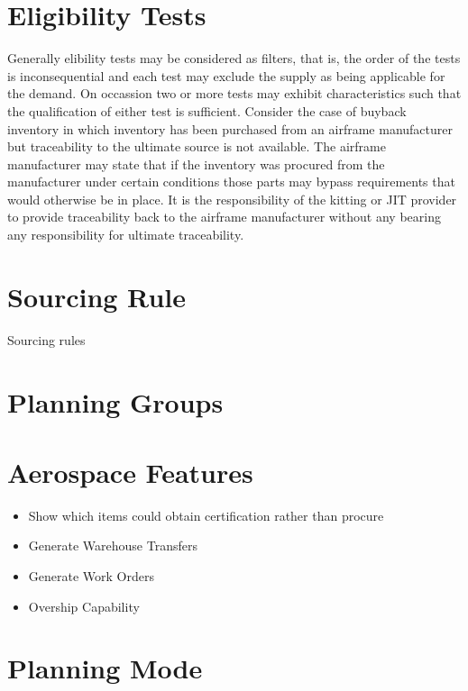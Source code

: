 \documentclass[letterpaper,10pt,english]{sphinxmanual}
\begin{document}
\section{Eligibility Tests}
\label{APS/Functional:eligibility-tests}
Generally elibility tests may be considered as filters, that is, the
order of the tests is inconsequential and each test may exclude the
supply as being applicable for the demand. On occassion two or more
tests may exhibit characteristics such that the qualification of either
test is sufficient. Consider the case of buyback inventory in which
inventory has been purchased from an airframe manufacturer but
traceability to the ultimate source is not available. The airframe
manufacturer may state that if the inventory was procured from the
manufacturer under certain conditions those parts may bypass
requirements that would otherwise be in place. It is the responsibility
of the kitting or JIT provider to provide traceability back to the
airframe manufacturer without any bearing any responsibility for
ultimate traceability.


\section{Sourcing Rule}
\label{APS/Functional:sourcing-rule}
Sourcing rules


\section{Planning Groups}
\label{APS/Functional:planning-groups}

\section{Aerospace Features}
\label{APS/Functional:aerospace-features}\begin{itemize}
\item {} 
Show which items could obtain certification rather than procure

\item {} 
Generate Warehouse Transfers

\item {} 
Generate Work Orders

\item {} 
Overship Capability

\end{itemize}


\section{Planning Mode}
\label{APS/Functional:planning-mode}
\end{document}
